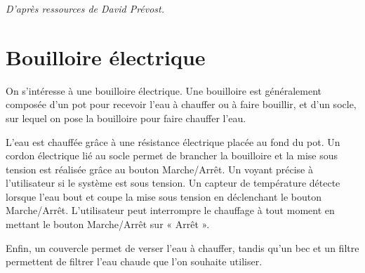 \documentclass[10pt]{article}
\begin{document}

\begin{flushright}
\textit{D'après ressources de David Prévost.}
\end{flushright}


\section*{Bouilloire électrique}

\begin{minipage}[c]{.65\linewidth}
On s’intéresse à une bouilloire électrique. Une bouilloire est généralement composée d’un pot pour recevoir l’eau à chauffer ou à faire bouillir, et d’un socle, sur lequel on pose la bouilloire pour faire chauffer l’eau.

L’eau est chauffée grâce à une résistance électrique placée au fond du pot. Un cordon électrique lié au socle permet de brancher la bouilloire et la mise sous tension est réalisée grâce au bouton Marche/Arrêt. Un voyant précise à l’utilisateur si le système est sous tension. Un capteur de température détecte lorsque l’eau bout et coupe la mise sous tension en déclenchant le bouton Marche/Arrêt. L’utilisateur peut interrompre le chauffage à tout moment en mettant le bouton Marche/Arrêt sur « Arrêt ».

Enfin, un couvercle permet de verser l’eau à chauffer, tandis qu’un bec et un filtre permettent de filtrer l’eau chaude que l’on souhaite utiliser.

\end{minipage}\hfill
\end{document}
